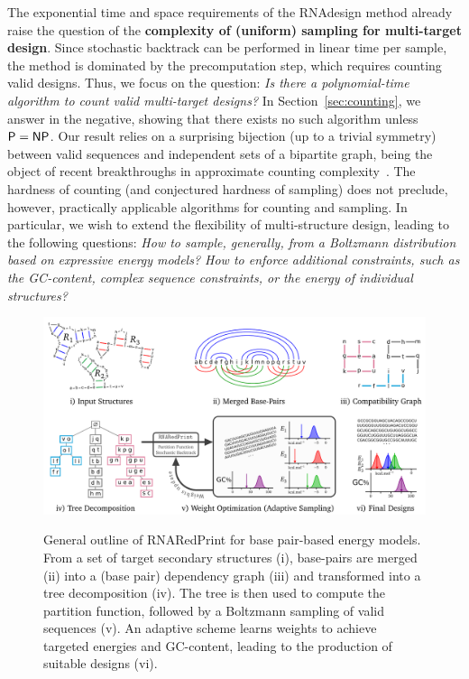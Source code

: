 \documentclass{bioinfo}
\newcommand{\Def}[1]{{\bfseries #1}}
\newcommand{\parHead}[1]{\Final{\paragraph{#1}}}
\newcommand{\Final}[1]{#1}
\renewcommand{\Final}[1]{}
\newcommand{\Nuc}[1]{{\sf #1}}
\newcommand{\Cb}{\Nuc{C}}
\newcommand{\Gb}{\Nuc{G}}
\newcommand{\GCb}{\Gb\Cb}
\newcommand{\Software}[1]{{\ttfamily #1}}
\newcommand{\ourprog}{\Software{RNARedPrint}}
\begin{document}
\parHead{Motivation.} The exponential time and space requirements of the \Software{RNAdesign} method already raise the question of the \Def{complexity of (uniform) sampling for multi-target design}. Since stochastic backtrack can be performed in linear time per sample, the method is dominated by the precomputation step, which requires counting valid designs. Thus, we focus on the question: \emph{Is there a polynomial-time algorithm to count valid multi-target designs?} In Section~\ref{sec:counting}, we answer in the negative, showing that there exists no such algorithm unless ${\sf P}={\sf NP}$. Our result relies on a surprising bijection (up to a trivial symmetry) between valid sequences  and independent sets of a bipartite graph, being the object of recent breakthroughs in approximate counting complexity~\citep{Bulatov2013,Cai2016}.
The hardness of counting (and conjectured hardness of sampling) does not preclude, however, practically applicable algorithms for counting and sampling. In particular, we wish to extend the flexibility of multi-structure design, leading to the following questions: \emph{How to sample, generally, from a Boltzmann distribution based on expressive energy models? How to enforce additional constraints, such as the \GCb-content, complex sequence constraints, or the energy of individual structures?}


\begin{figure}[t]
{\centering\includegraphics[width=.8\textwidth]{Figs/Workflow}\\}
\caption{General outline of \ourprog{} for base pair-based energy models. From a set of target secondary structures (i), base-pairs are merged (ii) into a (base pair) dependency graph (iii) and transformed into a tree decomposition (iv). The tree is then used to compute the partition function, followed by a Boltzmann sampling of valid sequences (v). An adaptive scheme learns weights to achieve targeted energies and \GCb-content, leading to the production of suitable designs (vi).}
\label{fig:workflow}
\end{figure}
\end{document}
